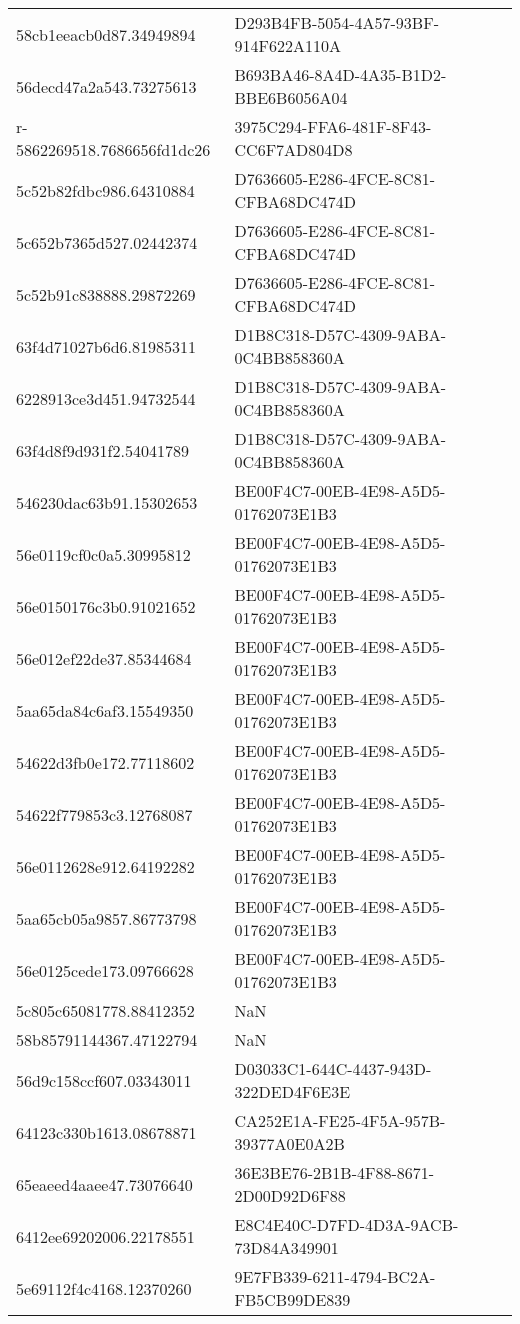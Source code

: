 \begin{tabular}{ll}
58cb1eeacb0d87.34949894 & D293B4FB-5054-4A57-93BF-914F622A110A \\
56decd47a2a543.73275613 & B693BA46-8A4D-4A35-B1D2-BBE6B6056A04 \\
r-5862269518.7686656fd1dc26 & 3975C294-FFA6-481F-8F43-CC6F7AD804D8 \\
5c52b82fdbc986.64310884 & D7636605-E286-4FCE-8C81-CFBA68DC474D \\
5c652b7365d527.02442374 & D7636605-E286-4FCE-8C81-CFBA68DC474D \\
5c52b91c838888.29872269 & D7636605-E286-4FCE-8C81-CFBA68DC474D \\
63f4d71027b6d6.81985311 & D1B8C318-D57C-4309-9ABA-0C4BB858360A \\
6228913ce3d451.94732544 & D1B8C318-D57C-4309-9ABA-0C4BB858360A \\
63f4d8f9d931f2.54041789 & D1B8C318-D57C-4309-9ABA-0C4BB858360A \\
546230dac63b91.15302653 & BE00F4C7-00EB-4E98-A5D5-01762073E1B3 \\
56e0119cf0c0a5.30995812 & BE00F4C7-00EB-4E98-A5D5-01762073E1B3 \\
56e0150176c3b0.91021652 & BE00F4C7-00EB-4E98-A5D5-01762073E1B3 \\
56e012ef22de37.85344684 & BE00F4C7-00EB-4E98-A5D5-01762073E1B3 \\
5aa65da84c6af3.15549350 & BE00F4C7-00EB-4E98-A5D5-01762073E1B3 \\
54622d3fb0e172.77118602 & BE00F4C7-00EB-4E98-A5D5-01762073E1B3 \\
54622f779853c3.12768087 & BE00F4C7-00EB-4E98-A5D5-01762073E1B3 \\
56e0112628e912.64192282 & BE00F4C7-00EB-4E98-A5D5-01762073E1B3 \\
5aa65cb05a9857.86773798 & BE00F4C7-00EB-4E98-A5D5-01762073E1B3 \\
56e0125cede173.09766628 & BE00F4C7-00EB-4E98-A5D5-01762073E1B3 \\
5c805c65081778.88412352 & NaN \\
58b85791144367.47122794 & NaN \\
56d9c158ccf607.03343011 & D03033C1-644C-4437-943D-322DED4F6E3E \\
64123c330b1613.08678871 & CA252E1A-FE25-4F5A-957B-39377A0E0A2B \\
65eaeed4aaee47.73076640 & 36E3BE76-2B1B-4F88-8671-2D00D92D6F88 \\
6412ee69202006.22178551 & E8C4E40C-D7FD-4D3A-9ACB-73D84A349901 \\
5e69112f4c4168.12370260 & 9E7FB339-6211-4794-BC2A-FB5CB99DE839 \\

\end{tabular}
